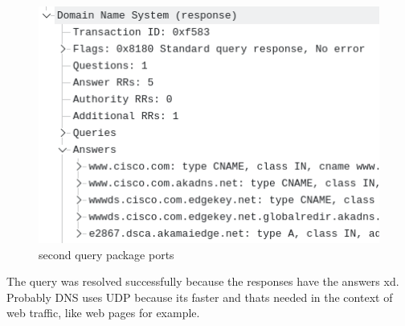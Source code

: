 \begin{figure}[htbp]
	\centering
	\includegraphics[width=1\linewidth]{img/12.png}
	\caption{second query package ports}\label{fig:12}
\end{figure}


The query was resolved successfully because the responses have the answers xd. Probably DNS uses UDP because its faster and thats needed in the context of web traffic, like web pages for example.


\cite{rfc1034}
